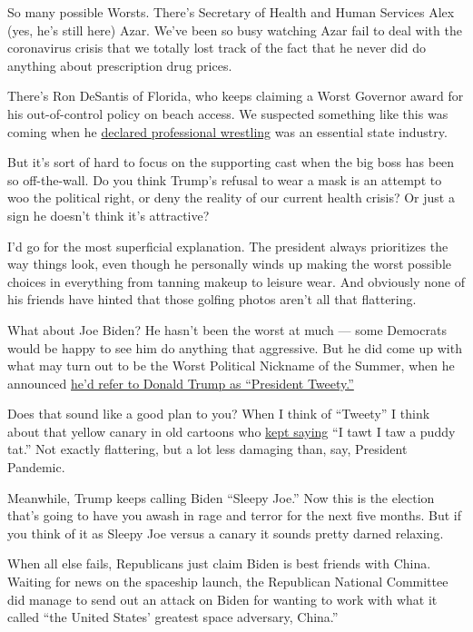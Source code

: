 So many possible Worsts. There's Secretary of Health and Human Services
Alex (yes, he's still here) Azar. We've been so busy watching Azar fail
to deal with the coronavirus crisis that we totally lost track of the
fact that he never did do anything about prescription drug prices.

There's Ron DeSantis of Florida, who keeps claiming a Worst Governor
award for his out-of-control policy on beach access. We suspected
something like this was coming when he
\href{https://www.vox.com/2020/4/15/21221948/florida-wwe-essential-service-ron-desantis-vince-mcmahon-coronavirus}{declared
professional wrestling} was an essential state industry.

But it's sort of hard to focus on the supporting cast when the big boss
has been so off-the-wall. Do you think Trump's refusal to wear a mask is
an attempt to woo the political right, or deny the reality of our
current health crisis? Or just a sign he doesn't think it's attractive?

I'd go for the most superficial explanation. The president always
prioritizes the way things look, even though he personally winds up
making the worst possible choices in everything from tanning makeup to
leisure wear. And obviously none of his friends have hinted that those
golfing photos aren't all that flattering.

What about Joe Biden? He hasn't been the worst at much --- some
Democrats would be happy to see him do anything that aggressive. But he
did come up with what may turn out to be the Worst Political Nickname of
the Summer, when he announced
\href{https://nypost.com/2020/05/19/joe-biden-finally-makes-up-nickname-for-trump-president-tweety/}{he'd
refer to Donald Trump as ``President Tweety.''}

Does that sound like a good plan to you? When I think of ``Tweety'' I
think about that yellow canary in old cartoons who
\href{https://www.youtube.com/watch?v=jHfpWqiU4ss}{kept saying} ``I tawt
I taw a puddy tat.'' Not exactly flattering, but a lot less damaging
than, say, President Pandemic.

Meanwhile, Trump keeps calling Biden ``Sleepy Joe.'' Now this is the
election that's going to have you awash in rage and terror for the next
five months. But if you think of it as Sleepy Joe versus a canary it
sounds pretty darned relaxing.

When all else fails, Republicans just claim Biden is best friends with
China. Waiting for news on the spaceship launch, the Republican National
Committee did manage to send out an attack on Biden for wanting to work
with what it called ``the United States' greatest space adversary,
China.''

